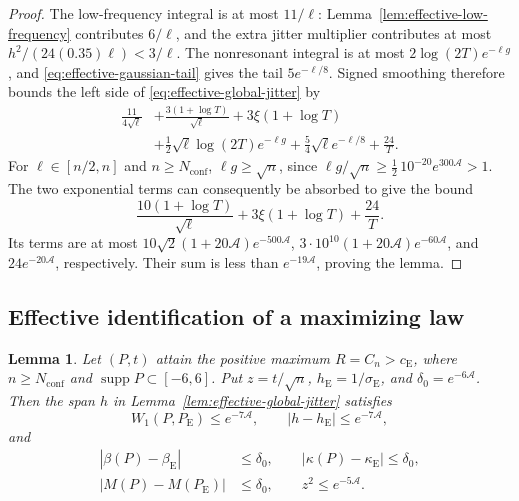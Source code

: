 \documentclass[aop]{imsart}
\theoremstyle{plain}
\newtheorem{lemma}[theorem]{Lemma}
\theoremstyle{definition}
\theoremstyle{definition}
\newcommand{\ce}{c_{\mathrm E}}
\newcommand{\se}{\sigma_{\mathrm E}}
\newcommand{\be}{\beta_{\mathrm E}}
\newcommand{\ke}{\kappa_{\mathrm E}}
\newcommand{\Pe}{P_{\mathrm E}}
\DeclareMathOperator{\supp}{supp}
\begin{document}
\begin{proof}
The low-frequency integral is at most $11/\ell$:
Lemma~\ref{lem:effective-low-frequency} contributes $6/\ell$, and
the extra jitter multiplier contributes at most
$h^2/(24(0.35)\ell)<3/\ell$.
The nonresonant integral is at most $2\log(2T)e^{-\ell g}$,
and \eqref{eq:effective-gaussian-tail} gives the tail
$5e^{-\ell/8}$.  Signed smoothing therefore bounds the left side
of \eqref{eq:effective-global-jitter} by
\begin{align*}
 \frac{11}{4\sqrt\ell}
 &+\frac{3(1+\log T)}{\sqrt\ell}
   +3\xi(1+\log T)\\
 &+\frac12\sqrt\ell\log(2T)e^{-\ell g}
   +\frac54\sqrt\ell e^{-\ell/8}+\frac{24}{T}.
\end{align*}
For $\ell\in[n/2,n]$ and $n\ge N_{\mathrm{conf}}$,
$\ell g\ge\sqrt n$, since
$\ell g/\sqrt n\ge\frac12\,10^{-20}e^{300\mathcal A}>1$.
The two exponential terms can consequently be absorbed to give
the bound
\[
 \frac{10(1+\log T)}{\sqrt\ell}
 +3\xi(1+\log T)+\frac{24}{T}.
\]
Its terms are at most
$10\sqrt2(1+20\mathcal A)e^{-500\mathcal A}$,
$3\cdot10^{10}(1+20\mathcal A)e^{-60\mathcal A}$, and
$24e^{-20\mathcal A}$, respectively.  Their sum is less than
$e^{-19\mathcal A}$, proving the lemma.
\end{proof}

\subsection{Effective identification of a maximizing law}

\begin{lemma}\label{lem:effective-identification}
Let $(P,t)$ attain the positive maximum $R=C_n>\ce$, where
$n\ge N_{\mathrm{conf}}$ and $\supp P\subset[-6,6]$.
Put $z=t/\sqrt n$, $h_{\mathrm E}=1/\se$, and $\delta_0=e^{-6\mathcal A}$.
Then the span $h$ in Lemma~\ref{lem:effective-global-jitter} satisfies
\begin{equation}\label{eq:effective-identification}
 W_1(P,\Pe)\le e^{-7\mathcal A},\qquad
 |h-h_{\mathrm E}|\le e^{-7\mathcal A},
\end{equation}
and
\begin{equation}\label{eq:effective-moment-identification}
 \begin{split}
 |\beta(P)-\be|&\le\delta_0,\qquad
 |\kappa(P)-\ke|\le\delta_0,\\
 |M(P)-M(\Pe)|&\le\delta_0,\qquad z^2\le e^{-5\mathcal A}.
 \end{split}
\end{equation}
\end{lemma}
\end{document}
